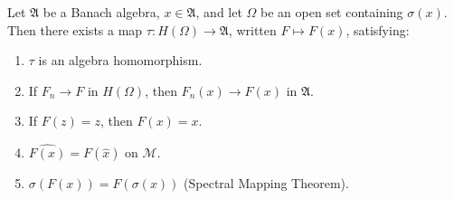 
Let $\mathfrak{A}$ be a Banach algebra, $x \in \mathfrak{A}$, and let $\Omega$ be an open set containing $\sigma(x)$. Then there exists a map $\tau : H(\Omega) \rightarrow \mathfrak{A}$, written $F \mapsto F(x)$, satisfying:
\begin{enumerate}
\item[(a)] $\tau$ is an algebra homomorphism.
\item[(b)] If $F_n \rightarrow F$ in $H(\Omega)$, then $F_n(x) \rightarrow F(x)$ in $\mathfrak{A}$.
\item[(c)] If $F(z) = z$, then $F(x) = x$.
\item[(d)] $\widehat{F(x)} = F(\hat{x})$ on $\mathcal{M}$.
\item[(e)] $\sigma(F(x)) = F(\sigma(x))$ (Spectral Mapping Theorem).
\end{enumerate}

